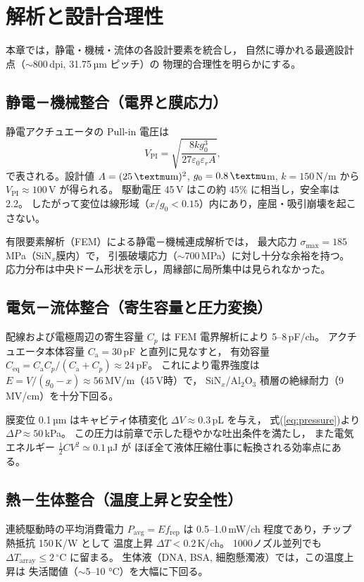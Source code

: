 \section{解析と設計合理性}

本章では，静電・機械・流体の各設計要素を統合し，
自然に導かれる最適設計点（$\sim$800\,dpi, 31.75\,µm ピッチ）の
物理的合理性を明らかにする。

\subsection{静電－機械整合（電界と膜応力）}
静電アクチュエータの Pull-in 電圧は
\begin{equation}
V_{\mathrm{PI}} = \sqrt{\frac{8 k g_0^3}{27 \varepsilon_0 \varepsilon_r A}},
\label{eq:vpi}
\end{equation}
で表される。設計値 $A=(25\,\textmu\mathrm{m})^2$, $g_0=0.8\,\textmu$m,
$k=150\,\mathrm{N/m}$ から $V_{\mathrm{PI}}\approx100$\,V が得られる。
駆動電圧 45\,V はこの約 45\% に相当し，安全率は 2.2。
したがって変位は線形域（$x/g_0 < 0.15$）内にあり，座屈・吸引崩壊を起こさない。

有限要素解析（FEM）による静電－機械連成解析では，
最大応力 $\sigma_\mathrm{max}=185$\,MPa（SiN$_x$膜内）で，
引張破壊応力（$\sim$700\,MPa）に対し十分な余裕を持つ。
応力分布は中央ドーム形状を示し，周縁部に局所集中は見られなかった。

\subsection{電気－流体整合（寄生容量と圧力変換）}
配線および電極周辺の寄生容量 $C_p$ は FEM 電界解析により 5--8\,pF/ch。
アクチュエータ本体容量 $C_\mathrm{a}=30$\,pF と直列に見なすと，
有効容量 $C_\mathrm{eq}=C_\mathrm{a}C_p/(C_\mathrm{a}+C_p)\approx24$\,pF。
これにより電界強度は $E=V/(g_0-x)\approx56$\,MV/m（45\,V時）で，
SiN$_x$/Al$_2$O$_3$ 積層の絶縁耐力（9\,MV/cm）を十分下回る。

膜変位 0.1\,µm はキャビティ体積変化 $\Delta V\approx0.3$\,pL を与え，
式(\ref{eq:pressure})より $\Delta P\approx50$\,kPa。
この圧力は前章で示した穏やかな吐出条件を満たし，
また電気エネルギー $\tfrac{1}{2}CV^2\simeq0.1$\,µJ が
ほぼ全て液体圧縮仕事に転換される効率点にある。

\subsection{熱－生体整合（温度上昇と安全性）}
連続駆動時の平均消費電力 $P_\mathrm{avg}=E f_\mathrm{rep}$ は
0.5--1.0\,mW/ch 程度であり，チップ熱抵抗 150\,K/W として
温度上昇 $\Delta T<0.2$\,K/ch。
1000ノズル並列でも $\Delta T_\mathrm{array}\le2\,^\circ$C に留まる。
生体液（DNA, BSA, 細胞懸濁液）では，この温度上昇は
失活閾値（$\sim$5–10 °C）を大幅に下回る。

